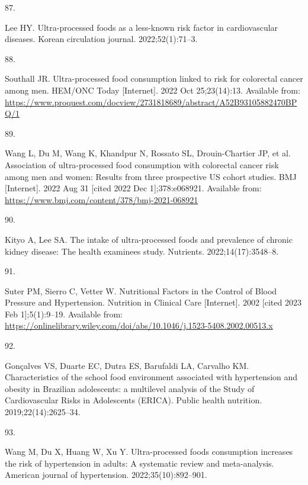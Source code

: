 \documentclass[
]{article}
\newlength{\cslhangindent}
\newlength{\csllabelwidth}
\newlength{\cslentryspacingunit} %
\newenvironment{CSLReferences}[2] %
 {%
  \setlength{\parindent}{0pt}
  \ifodd #1
  \let\oldpar\par
  \def\par{\hangindent=\cslhangindent\oldpar}
  \fi
  \setlength{\parskip}{#2\cslentryspacingunit}
 }%
 {}
\newcommand{\CSLLeftMargin}[1]{\parbox[t]{\csllabelwidth}{#1}}
\newcommand{\CSLRightInline}[1]{\parbox[t]{\linewidth - \csllabelwidth}{#1}\break}
\begin{document}
\begin{CSLReferences}{0}{0}
\leavevmode{}%
\CSLLeftMargin{87. }%
\CSLRightInline{Lee HY. Ultra-processed foods as a less-known risk
factor in cardiovascular diseases. Korean circulation journal.
2022;52(1):71--3. }

\leavevmode{}%
\CSLLeftMargin{88. }%
\CSLRightInline{Southall JR. Ultra-processed food consumption linked to
risk for colorectal cancer among men. HEM/ONC Today {[}Internet{]}. 2022
Oct 25;23(14):13. Available from:
\url{https://www.proquest.com/docview/2731818689/abstract/A52B93105882470BPQ/1}}

\leavevmode{}%
\CSLLeftMargin{89. }%
\CSLRightInline{Wang L, Du M, Wang K, Khandpur N, Rossato SL,
Drouin-Chartier JP, et al. Association of ultra-processed food
consumption with colorectal cancer risk among men and women: Results
from three prospective {US} cohort studies. BMJ {[}Internet{]}. 2022 Aug
31 {[}cited 2022 Dec 1{]};378:e068921. Available from:
\url{https://www.bmj.com/content/378/bmj-2021-068921}}

\leavevmode{}%
\CSLLeftMargin{90. }%
\CSLRightInline{Kityo A, Lee SA. The intake of ultra-processed foods and
prevalence of chronic kidney disease: The health examinees study.
Nutrients. 2022;14(17):3548--8. }

\leavevmode{}%
\CSLLeftMargin{91. }%
\CSLRightInline{Suter PM, Sierro C, Vetter W. Nutritional {Factors} in
the {Control} of {Blood Pressure} and {Hypertension}. Nutrition in
Clinical Care {[}Internet{]}. 2002 {[}cited 2023 Feb 1{]};5(1):9--19.
Available from:
\url{https://onlinelibrary.wiley.com/doi/abs/10.1046/j.1523-5408.2002.00513.x}}

\leavevmode{}%
\CSLLeftMargin{92. }%
\CSLRightInline{Gonçalves VS, Duarte EC, Dutra ES, Barufaldi LA,
Carvalho KM. Characteristics of the school food environment associated
with hypertension and obesity in Brazilian adolescents: a multilevel
analysis of the Study of Cardiovascular Risks in Adolescents (ERICA).
Public health nutrition. 2019;22(14):2625--34. }

\leavevmode{}%
\CSLLeftMargin{93. }%
\CSLRightInline{Wang M, Du X, Huang W, Xu Y. Ultra-processed foods
consumption increases the risk of hypertension in adults: {A} systematic
review and meta-analysis. American journal of hypertension.
2022;35(10):892--901. }


\end{CSLReferences}
\end{document}
